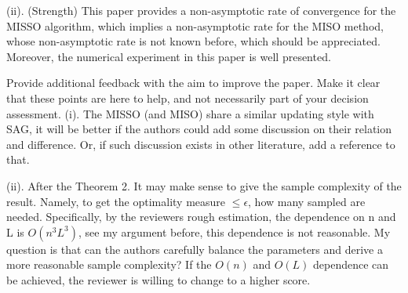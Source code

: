 \documentclass{article}
\begin{document}
(ii). (Strength) This paper provides a non-asymptotic rate of convergence for the MISSO algorithm, which implies a non-asymptotic rate for the MISO method, whose non-asymptotic rate is not known before, which should be appreciated. Moreover, the numerical experiment in this paper is well presented.

Provide additional feedback with the aim to improve the paper. Make it clear that these points are here to help, and not necessarily part of your decision assessment.
(i). The MISSO (and MISO) share a similar updating style with SAG, it will be better if the authors could add some discussion on their relation and difference. Or, if such discussion exists in other literature, add a reference to that.

(ii). After the Theorem 2. It may make sense to give the sample complexity of the result. Namely, to get the optimality measure $ \leq \epsilon$, how many sampled are needed. Specifically, by the reviewers rough estimation, the dependence on n and L is $O(n^3L^3)$, see my argument before, this dependence is not reasonable. My question is that can the authors carefully balance the parameters and derive a more reasonable sample complexity? If the $O(n)$ and $O(L)$ dependence can be achieved, the reviewer is willing to change to a higher score.
\end{document}

